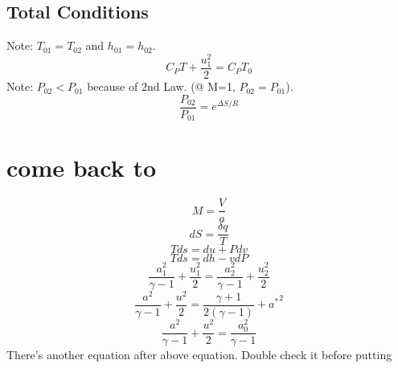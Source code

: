 \documentclass{article}
\begin{document}
\subsection{Total Conditions}
Note: $ T_{01} = T_{02} $ and $ h_{01} = h_{02} $.
\[ C_P T + \frac{u_1^2}{2} = C_P T_0 \]
Note: $P_{02} < P_{01} $ because of 2nd Law. (@ M=1, $P_{02} = P_{01} $). 
\[ \frac{P_{02}}{P_{01}} = e^{\Delta S/R} \]

\section{come back to}
\[ M = \frac{V}{a} \]
\[ dS = \frac{\delta q}{T} \]
\[ Tds = du + Pdv \]
\[ Tds = dh - vdP \]
\[ \frac{a_1^2}{\gamma-1} + \frac{u_1^2}{2} = \frac{a_2^2}{\gamma-1} + \frac{u_2^2}{2} \]
\[ \frac{a^2}{\gamma-1} + \frac{u^2}{2} = \frac{\gamma+1}{2(\gamma-1)} + {a^*}^2 \]
\[ \frac{a^2}{\gamma-1} + \frac{u^2}{2} = \frac{a_0^2}{\gamma-1} \]
There's another equation after above equation. Double check it before putting
\end{document}
